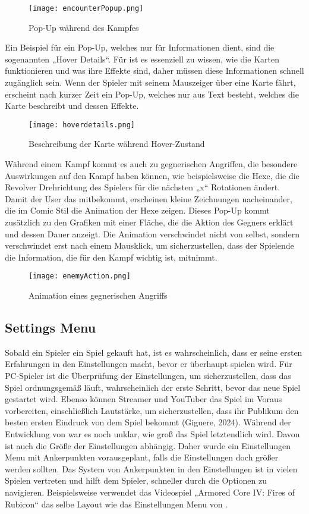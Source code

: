 \begin{figure}[H]
    \centering
    \texttt{[image: encounterPopup.png]}
    \caption{Pop-Up während des Kampfes}
\end{figure}

Ein Beispiel für ein Pop-Up, welches nur für Informationen dient, sind die sogenannten „Hover Details“. Für \FF ist es essenziell zu wissen, wie die Karten funktionieren und was ihre Effekte sind, daher müssen diese Informationen schnell zugänglich sein. Wenn der Spieler mit seinem Mauszeiger über eine Karte fährt, erscheint nach kurzer Zeit ein Pop-Up, welches nur aus Text besteht, welches die Karte beschreibt und dessen Effekte.

\begin{figure}[H]
    \centering
    \texttt{[image: hoverdetails.png]}
    \caption{Beschreibung der Karte während Hover-Zustand}
\end{figure}

Während einem Kampf kommt es auch zu gegnerischen Angriffen, die besondere Auswirkungen auf den Kampf haben können, wie beispielsweise die Hexe, die die Revolver Drehrichtung des Spielers für die nächsten „x“ Rotationen ändert. Damit der User das mitbekommt, erscheinen kleine Zeichnungen nacheinander, die im Comic Stil die Animation der Hexe zeigen. Dieses Pop-Up kommt zusätzlich zu den Grafiken mit einer Fläche, die die Aktion des Gegners erklärt und dessen Dauer anzeigt. Die Animation verschwindet nicht von selbst, sondern verschwindet erst nach einem Mausklick, um sicherzustellen, dass der Spielende die Information, die für den Kampf wichtig ist, mitnimmt.

\begin{figure}[H]
    \centering
    \texttt{[image: enemyAction.png]}
    \caption{Animation eines gegnerischen Angriffs}
\end{figure}

\subsection{Settings Menu}

Sobald ein Spieler ein Spiel gekauft hat, ist es wahrscheinlich, dass er seine ersten Erfahrungen in den Einstellungen macht, bevor er überhaupt spielen wird. Für PC-Spieler ist die Überprüfung der Einstellungen, um sicherzustellen, dass das Spiel ordnungsgemäß läuft, wahrscheinlich der erste Schritt, bevor das neue Spiel gestartet wird. Ebenso können Streamer und YouTuber das Spiel im Voraus vorbereiten, einschließlich Lautstärke, um sicherzustellen, dass ihr Publikum den besten ersten Eindruck von dem Spiel bekommt (Giguere, 2024). Während der Entwicklung von \FF war es noch unklar, wie groß das Spiel letztendlich wird. Davon ist auch die Größe der Einstellungen abhängig. Daher wurde ein Einstellungen Menu mit Ankerpunkten vorausgeplant, falls die Einstellungen doch größer werden sollten. Das System von Ankerpunkten in den Einstellungen ist in vielen Spielen vertreten und hilft dem Spieler, schneller durch die Optionen zu navigieren. Beispielsweise verwendet das Videospiel „Armored Core IV: Fires of Rubicon“ das selbe Layout wie das Einstellungen Menu von \FF.

